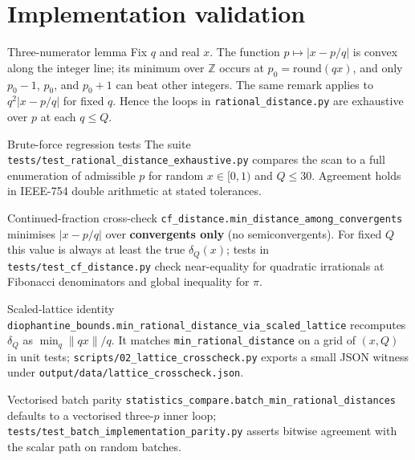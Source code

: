 \documentclass[
  ignorenonframetext,
]{beamer}
\author{\texorpdfstring{}{}}
\date{}
\begin{document}
\section{Implementation validation}\label{implementation-validation}

\begin{frame}[fragile]{Three-numerator lemma}
\protect{}\label{three-numerator-lemma}
Fix \(q\) and real \(x\). The function \(p \mapsto |x - p/q|\) is convex
along the integer line; its minimum over \(\mathbb{Z}\) occurs at
\(p_0 = \mathrm{round}(qx)\), and only \(p_0-1\), \(p_0\), and \(p_0+1\)
can beat other integers. The same remark applies to \(q^2|x-p/q|\) for
fixed \(q\). Hence the loops in \texttt{rational\_distance.py} are
exhaustive over \(p\) at each \(q \leq Q\).
\end{frame}

\begin{frame}[fragile]{Brute-force regression tests}
\protect{}\label{brute-force-regression-tests}
The suite \texttt{tests/test\_rational\_distance\_exhaustive.py}
compares the scan to a full enumeration of admissible \(p\) for random
\(x \in [0,1)\) and \(Q \leq 30\). Agreement holds in IEEE-754 double
arithmetic at stated tolerances.
\end{frame}

\begin{frame}[fragile]{Continued-fraction cross-check}
\protect{}\label{continued-fraction-cross-check}
\texttt{cf\_distance.min\_distance\_among\_convergents} minimises
\(|x-p/q|\) over \textbf{convergents only} (no semiconvergents). For
fixed \(Q\) this value is always at least the true \(\delta_Q(x)\);
tests in \texttt{tests/test\_cf\_distance.py} check near-equality for
quadratic irrationals at Fibonacci denominators and global inequality
for \(\pi\).
\end{frame}

\begin{frame}[fragile]{Scaled-lattice identity}
\protect{}\label{scaled-lattice-identity}
\texttt{diophantine\_bounds.min\_rational\_distance\_via\_scaled\_lattice}
recomputes \(\delta_Q\) as \(\min_q \|qx\|/q\). It matches
\texttt{min\_rational\_distance} on a grid of \((x,Q)\) in unit tests;
\texttt{scripts/02\_lattice\_crosscheck.py} exports a small JSON witness
under \texttt{output/data/lattice\_crosscheck.json}.
\end{frame}

\begin{frame}[fragile]{Vectorised batch parity}
\protect{}\label{vectorised-batch-parity}
\texttt{statistics\_compare.batch\_min\_rational\_distances} defaults to
a vectorised three-\(p\) inner loop;
\texttt{tests/test\_batch\_implementation\_parity.py} asserts bitwise
agreement with the scalar path on random batches.
\end{frame}
\end{document}
